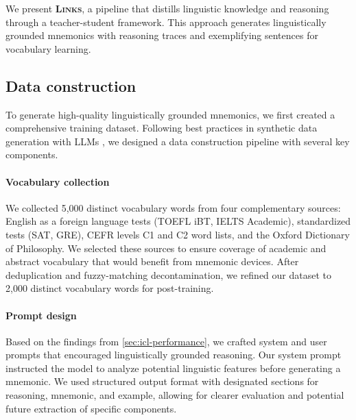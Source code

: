 \documentclass[11pt]{article}
\newcommand{\links}{\textbf{\textsc{Links}}}
\begin{document}

We present \links, a pipeline that distills linguistic knowledge and reasoning through a teacher-student framework. This approach generates linguistically grounded mnemonics with reasoning traces and exemplifying sentences for vocabulary learning.

\subsection{Data construction} \label{sec:data-gen}
To generate high-quality linguistically grounded mnemonics, we first created a comprehensive training dataset. Following best practices in synthetic data generation with LLMs \citetext{\citealp{longLLMsDrivenSyntheticData2024b}, \citealp{openthoughtsteamOpenThoughts2025}}, we designed a data construction pipeline with several key components.

\paragraph{Vocabulary collection} We collected 5,000 distinct vocabulary words from four complementary sources: English as a foreign language tests (TOEFL iBT, IELTS Academic), standardized tests (SAT, GRE), CEFR levels C1 and C2 word lists, and the Oxford Dictionary of Philosophy. We selected these sources to ensure coverage of academic and abstract vocabulary that would benefit from mnemonic devices. After deduplication and fuzzy-matching decontamination, we refined our dataset to 2,000 distinct vocabulary words for post-training.

\paragraph{Prompt design} Based on the findings from \cref{sec:icl-performance}, we crafted system and user prompts that encouraged linguistically grounded reasoning. Our system prompt instructed the model to analyze potential linguistic features before generating a mnemonic. We used structured output format with designated sections for reasoning, mnemonic, and example, allowing for clearer evaluation and potential future extraction of specific components.
\end{document}
